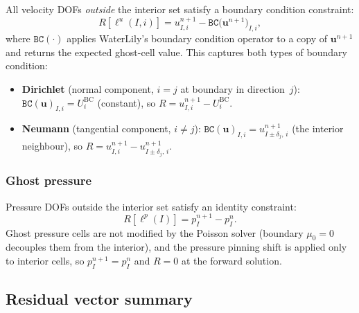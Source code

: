 \documentclass[11pt]{article}
\newcommand{\vect}[1]{\bm{#1}}
\begin{document}
All velocity DOFs \emph{outside} the interior set satisfy a boundary
condition constraint:
\begin{equation}\label{eq:res_bc_vel}
  \boxed{R[\ell^{u}(I,i)] = u^{n+1}_{I,i} - \texttt{BC}\bigl(\vect{u}^{n+1}\bigr)_{I,i},}
\end{equation}
where $\texttt{BC}(\cdot)$ applies WaterLily's boundary condition
operator to a copy of $\vect{u}^{n+1}$ and returns the expected
ghost-cell value.  This captures both types of boundary condition:
\begin{itemize}
  \item \textbf{Dirichlet} (normal component, $i=j$ at boundary in
    direction~$j$): $\texttt{BC}(\vect{u})_{I,i} = U_i^{\mathrm{BC}}$
    (constant), so
    $R = u^{n+1}_{I,i} - U_i^{\mathrm{BC}}$.
  \item \textbf{Neumann} (tangential component, $i \neq j$):
    $\texttt{BC}(\vect{u})_{I,i} = u^{n+1}_{I\pm\delta_j,\,i}$
    (the interior neighbour), so
    $R = u^{n+1}_{I,i} - u^{n+1}_{I\pm\delta_j,\,i}$.
\end{itemize}

\subsubsection{Ghost pressure}

Pressure DOFs outside the interior set satisfy an identity constraint:
\begin{equation}\label{eq:res_bc_prs}
  \boxed{R[\ell^{p}(I)] = p^{n+1}_I - p^{n}_I.}
\end{equation}
Ghost pressure cells are not modified by the Poisson solver (boundary
$\mu_0=0$ decouples them from the interior), and the pressure pinning
shift is applied only to interior cells, so $p^{n+1}_I = p^{n}_I$ and
$R=0$ at the forward solution.

\subsection{Residual vector summary}
\end{document}
